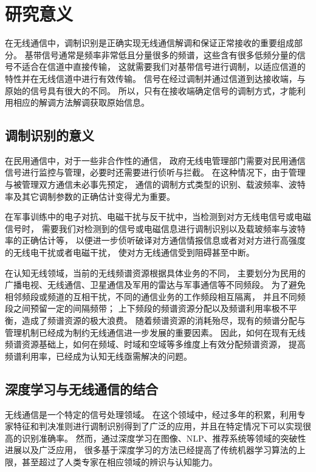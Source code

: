 \section{研究意义}

在无线通信中，调制识别是正确实现无线通信解调和保证正常接收的重要组成部分。
基带信号通常是频率非常低且分量很多的频谱，这些含有很多低频分量的信号不适合在信道中直接传输，
这就需要我们对基带信号进行调制，以适应信道的特性并在无线信道中进行有效传输。
信号在经过调制并通过信道到达接收端，与原始的信号具有很大的不同。
所以，只有在接收端确定信号的调制方式，才能利用相应的解调方法解调获取原始信息。\par

\subsection{调制识别的意义}
在民用通信中，对于一些非合作性的通信，
政府无线电管理部门需要对民用通信信号进行监控与管理，必要时还需要进行侦听与拦截。
在这种情况下，由于管理与被管理双方通信未必事先预定，
通信的调制方式类型的识别、载波频率、波特率及其它调制参数的正确估计变得尤为重要。\par

在军事训练中的电子对抗、电磁干扰与反干扰中，当检测到对方无线电信号或电磁信号时，
需要我们对检测到的信号或电磁信息进行调制识别以及载玻频率与波特率的正确估计等，
以便进一步侦听破译对方通信情报信息或者对对方进行高强度的无线电干扰或者电磁干扰，
使对方无线通信受到阻碍甚至中断。\par

在认知无线领域，当前的无线频谱资源根据具体业务的不同，
主要划分为民用的广播电视、无线通信、卫星通信及军用的雷达与军事通信等不同频段。
为了避免相邻频段或频道的互相干扰，不同的通信业务的工作频段相互隔离，
并且不同频段之间预留一定的间隔频带；
上下频段的频谱资源分配以及频谱利用率极不平衡，造成了频谱资源的极大浪费。
随着频谱资源的消耗殆尽，现有的频谱分配与管理机制已经成为制约无线通信进一步发展的重要因素。
因此，如何在现有无线频谱资源基础上，如何在频域、时域和空域等多维度上有效分配频谱资源，
提高频谱利用率，已经成为认知无线亟需解决的问题。\par

\subsection{深度学习与无线通信的结合}

无线通信是一个特定的信号处理领域。 
在这个领域中，经过多年的积累，利用专家特征和判决准则进行调制识别得到了广泛的应用，并且在特定情况下可以实现很高的识别准确率。
然而，通过深度学习在图像、NLP、推荐系统等领域的突破性进展以及广泛应用，
很多基于深度学习的方法已经提高了传统机器学习算法的上限，甚至超过了人类专家在相应领域的辨识与认知能力。\par

